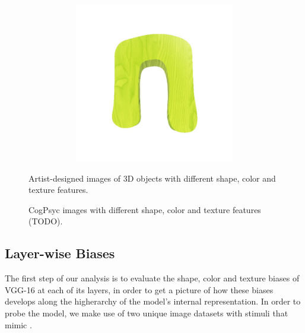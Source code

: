 \begin{figure}[h!]
\begin{center}
\begin{subfigure}[b]{0.3\textwidth}
\begin{center}
\begin{subfigure}[b]{0.4\textwidth}
                \end{subfigure}
                \begin{subfigure}[b]{0.4\textwidth}
                    \includegraphics[width=\linewidth]{figures/artist_objects/fake4_wood_green.jpg}
                \end{subfigure}
            \end{center}
        \end{subfigure}
    \end{center}
    \caption{Artist-designed images of 3D objects with different shape, color and texture features.}
    \label{fig:artist_images}
\end{figure}

\begin{figure}[h!]
    \caption{CogPsyc images with different shape, color and texture features (TODO).}
    \label{fig:cogpsyc_images}
\end{figure}

\subsection{Layer-wise Biases}
The first step of our analysis is to evaluate the shape, color and texture biases of VGG-16
at each of its layers, in order to get a picture of how these biases develops along the
higherarchy of the model's internal representation. In order to probe the model, we make
use of two unique image datasets with stimuli that mimic \cite{Smith2002}.

